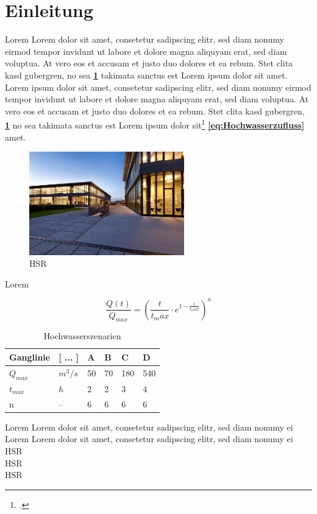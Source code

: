 \section{Einleitung}


Lorem Lorem dolor sit amet, consetetur sadipscing elitr, sed diam nonumy eirmod tempor invidunt ut labore et dolore magna aliquyam erat, sed diam voluptua. At vero eos et accusam et justo duo dolores et \autocite[22]{Roppel2006} ea rebum. Stet clita kasd gubergren, no sea \textbf{\ref{tab:Hochwasserszenarien}} takimata sanctus est Lorem ipsum dolor sit amet. Lorem ipsum dolor sit amet, consetetur sadipscing elitr, sed diam nonumy eirmod tempor invidunt ut labore et dolore magna aliquyam erat, sed diam voluptua. At vero eos et accusam et justo duo dolores et ea rebum. Stet clita kasd gubergren, \textbf{\ref{fig:HSR}} no sea takimata sanctus est Lorem ipsum dolor sit\footcite{Roppel2006} \textbf{\ref{eq:Hochwasserzufluss}} amet.

\begin{figure}[ht]
	\centering
	\includegraphics[width=0.6\textwidth]{images/HSR}
	\caption{\acs{HSR} \autocite{IR}}
	\label{fig:HSR}
\end{figure}

Lorem

 \begin{equation}\label{eq:Hochwasserzufluss}
\frac{Q(t)}{Q_{max}} = \left(\frac{t}{t_max}\cdot e^{1-\frac{t}{t_max}} \right)^n
\end{equation}

\begin{table}[ht]
	\begin{tabular}{|l|l|l|l|l|l|}
		\hline 
		\textbf{Ganglinie}	&\textbf{[ ... ]}  	& \textbf{A} 	 & \textbf{B}  	& \textbf{C} 	& \textbf{D}  \\ 
		\hline 
		$ Q_{max} $			& $ m^3/s $ 		& 50 			& 70		  	& 180			& 540 \\ 
		\hline 
		$ t_{max} $			& $ h $ 			& 2  			& 2 			& 3 			& 4 \\ 
		\hline 
		n					& --  				& 6  			& 6 			& 6 			& 6  \\ 
		\hline 
	\end{tabular} 
	\caption{Hochwasserszenarien}\label{tab:Hochwasserszenarien}
\end{table}

Lorem  Lorem dolor sit amet, consetetur sadipscing elitr, sed diam nonumy ei\\

Lorem  Lorem dolor sit amet, consetetur sadipscing elitr, sed diam nonumy ei \\
\ac{HSR}\\
\acs{HSR}\\
\acl{HSR}


\clearpage